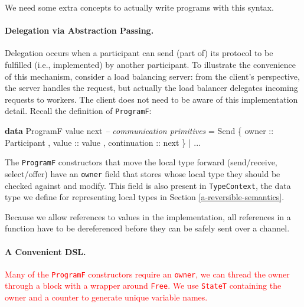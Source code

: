 \documentclass[runningheads,plain]{llncs}
\newcommand{\checkthis}[1]{\textcolor{red}{#1}}
\newenvironment{Shaded}{}{}
\newcommand{\KeywordTok}[1]{\textcolor[rgb]{0.00,0.44,0.13}{\textbf{#1}}}
\newcommand{\DataTypeTok}[1]{\textcolor[rgb]{0.56,0.13,0.00}{#1}}
\newcommand{\CommentTok}[1]{\textcolor[rgb]{0.38,0.63,0.69}{\textit{#1}}}
\newcommand{\OtherTok}[1]{\textcolor[rgb]{0.00,0.44,0.13}{#1}}
\newcommand{\FunctionTok}[1]{\textcolor[rgb]{0.02,0.16,0.49}{#1}}
\newcommand{\NormalTok}[1]{#1}
\begin{document}
We need some extra concepts to actually write programs with this syntax.

\paragraph{Delegation via Abstraction Passing.}\label{abstraction-passing}

Delegation occurs when a participant can send (part of)
its protocol to be fulfilled (i.e., implemented) by another participant. 
To illustrate the convenience of this mechanism, 
consider a  load balancing server: from the client's
perspective, the server handles the request, but actually the load
balancer delegates incoming requests to workers. The client does not
need to be aware of this implementation detail.
Recall the definition of \texttt{ProgramF}:
\begin{Shaded}
\begin{Highlighting}[]
\KeywordTok{data} \DataTypeTok{ProgramF}\NormalTok{ value next }
    \CommentTok{-- communication primitives}
    \FunctionTok{=} \DataTypeTok{Send} 
\NormalTok{        \{}\OtherTok{ owner ::} \DataTypeTok{Participant}
\NormalTok{        ,}\OtherTok{ value ::}\NormalTok{ value}
\NormalTok{        ,}\OtherTok{ continuation ::}\NormalTok{ next }
\NormalTok{        \}}
    \FunctionTok{|} \FunctionTok{...} 
\end{Highlighting}
\end{Shaded}
The \texttt{ProgramF} constructors that move the local type forward
(send/receive, select/offer) have an \texttt{owner} field that stores
whose local type they should be checked against and modify. This field is
also present in \texttt{TypeContext}, the data type we define for representing local types in Section \ref{a-reversible-semantics}. 

Because we allow references to values in the implementation, all
references in a function have to be dereferenced before they can be safely
sent over a channel.

\paragraph{A Convenient DSL.}\label{high-level-dsl}
\checkthis{
Many of the \texttt{ProgramF} constructors require an \texttt{owner}, we
can thread the owner through a block with a wrapper around
\texttt{Free}. We use \texttt{StateT} containing the owner and a counter
to generate unique variable names.}
\end{document}

